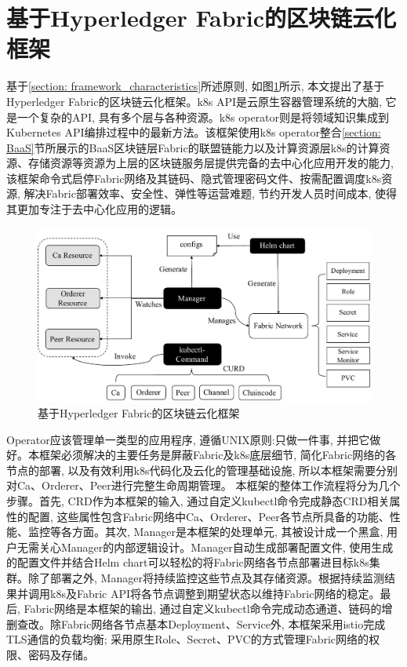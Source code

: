 \section{基于Hyperledger Fabric的区块链云化框架}

基于\ref{section: framework_characteristics}所述原则, 如图\ref{framework}所示, 本文提出了基于Hyperledger Fabric的区块链云化框架。k8s API是云原生容器管理系统的大脑, 它是一个复杂的API, 具有多个层与各种资源\cite{Yilmaz2021}。k8s operator则是将领域知识集成到Kubernetes API编排过程中的最新方法\cite{henning2021reproducible}。该框架使用k8s operator整合\ref{section: BaaS}节所展示的BaaS区块链层Fabric的联盟链能力以及计算资源层k8s的计算资源、存储资源等资源为上层的区块链服务层提供完备的去中心化应用开发的能力, 该框架命令式启停Fabric网络及其链码、隐式管理密码文件、按需配置调度k8s资源, 解决Fabric部署效率、安全性、弹性等运营难题, 节约开发人员时间成本, 使得其更加专注于去中心化应用的逻辑。

\begin{figure}[h] %
    \centering %
    \includegraphics[width=1.0\textwidth]{FIGs/chapter3/framework.pdf} %
    \caption{基于Hyperledger Fabric的区块链云化框架} %
    \label{framework} %
\end{figure}%

Operator应该管理单一类型的应用程序, 遵循UNIX原则:只做一件事, 并把它做好\cite{d2020design}。本框架必须解决的主要任务是屏蔽Fabric及k8s底层细节, 简化Fabric网络的各节点的部署, 以及有效利用k8s代码化及云化的管理基础设施, 所以本框架需要分别对Ca、Orderer、Peer进行完整生命周期管理。
本框架的整体工作流程将分为几个步骤。首先, CRD作为本框架的输入, 通过自定义kubectl命令完成静态CRD相关属性的配置, 这些属性包含Fabric网络中Ca、Orderer、Peer各节点所具备的功能、性能、监控等各方面。其次, Manager是本框架的处理单元, 其被设计成一个黑盒\cite{yu2020system}, 用户无需关心Manager的内部逻辑设计。Manager自动生成部署配置文件, 使用生成的配置文件并结合Helm chart可以轻松的将Fabric网络各节点部署进目标k8s集群。除了部署之外,  Manager将持续监控这些节点及其存储资源。根据持续监测结果并调用k8s及Fabric API将各节点调整到期望状态以维持Fabric网络的稳定。最后, Fabric网络是本框架的输出, 通过自定义kubectl命令完成动态通道、链码的增删查改。除Fabric网络各节点基本Deployment、Service外, 本框架采用istio完成TLS通信的负载均衡; 采用原生Role、Secret、PVC的方式管理Fabric网络的权限、密码及存储。


